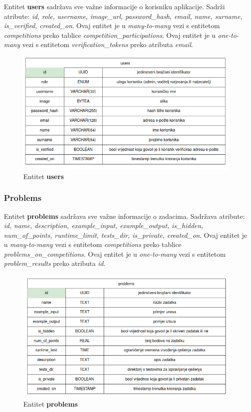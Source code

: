 		Entitet \textbf{users} sadržava sve važne informacije o korisniku aplikacije. Sadrži atribute: \textit{id, role, username, image\_url, password\_hash, email, name, surname, is\_verified, created\_on}. 
		Ovaj entitet je u \textit{many-to-many} vezi s entitetom \textit{competitions} preko tablice \textit{competition\_participations}. Ovaj entitet je u \textit{one-to-many} vezi s entitetom \textit{verification\_tokens} preko atributa \textit{email}. 
		
		\begin{figure}[htbp]
			\centering
			\includegraphics[width=\linewidth]{slike/users_tablica.png}
			\caption{Entitet \textbf{users}}
		\end{figure}
		\eject
		
		\subsubsection*{Problems}
		
		Entitet \textbf{problems} sadržava sve važne informacije o zadacima. Sadržava atribute: \textit{id, name, description, example\_input, example\_output, is\_hidden, num\_of\_points, runtime\_limit, tests\_dir, is\_private, created\_on}. Ovaj entitet je u \textit{many-to-many} vezi s entitetom \textit{competitions} preko tablice \textit{problems\_on\_competitions}. Ovaj entitet je u \textit{one-to-many} vezi s entitetom \textit{problem\_results} preko atributa \textit{id}.
		
		\begin{figure}[htbp]
			\centering
			\includegraphics[width=\linewidth]{slike/problems_tablica.png}
			\caption{Entitet \textbf{problems}}
		\end{figure}
		\eject
		
